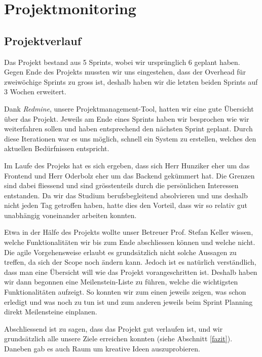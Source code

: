 \chapter{Projektmonitoring}
\label{projektmonitoring}





\section{Projektverlauf}
Das Projekt bestand aus 5 Sprints, wobei wir ursprünglich 6 geplant haben.
Gegen Ende des Projekts mussten wir uns eingestehen, dass der Overhead für zweiwöchige Sprints zu gross ist, deshalb haben wir die letzten beiden Sprints auf 3 Wochen erweitert.

Dank \emph{Redmine}, unsere Projektmanagement-Tool, hatten wir eine gute Übersicht über das Projekt.
Jeweils am Ende eines Sprints haben wir besprochen wie wir weiterfahren sollen und haben entsprechend den nächsten Sprint geplant.
Durch diese Iterationen war es uns möglich, schnell ein System zu erstellen, welches den aktuellen Bedürfnissen entspricht.

Im Laufe des Projeks hat es sich ergeben, dass sich Herr Hunziker eher um das Frontend und Herr Oderbolz eher um das Backend gekümmert hat.
Die Grenzen sind dabei fliessend und sind grösstenteils durch die persönlichen Interessen entstanden.
Da wir das Studium berufsbegleitend absolvieren und uns deshalb nicht jeden Tag getroffen haben, hatte dies den Vorteil, dass wir so relativ gut unabhängig voneinander arbeiten konnten.

Etwa in der Hälfe des Projekts wollte unser Betreuer Prof. Stefan Keller wissen, welche Funktionalitäten wir bis zum Ende abschliessen können und welche nicht.
Die agile Vorgehensweise erlaubt es grundsätzlich nicht solche Aussagen zu treffen, da sich der Scope noch ändern kann.
Jedoch ist es natürlich verständlich, dass man eine Übersicht will wie das Projekt vorangeschritten ist.
Deshalb haben wir dann begonnen eine Meilenstein-Liste zu führen, welche die wichtigsten Funktionalitäten aufzeigt.
So konnten wir zum einen jeweils zeigen, was schon erledigt und was noch zu tun ist und zum anderen jeweils beim Sprint Planning direkt Meilensteine einplanen.

Abschliessend ist zu sagen, dass das Projekt gut verlaufen ist, und wir grundsätzlich alle unsere Ziele erreichen konnten (siehe Abschnitt \ref{fazit}).
Daneben gab es auch Raum um kreative Ideen auszuprobieren.

